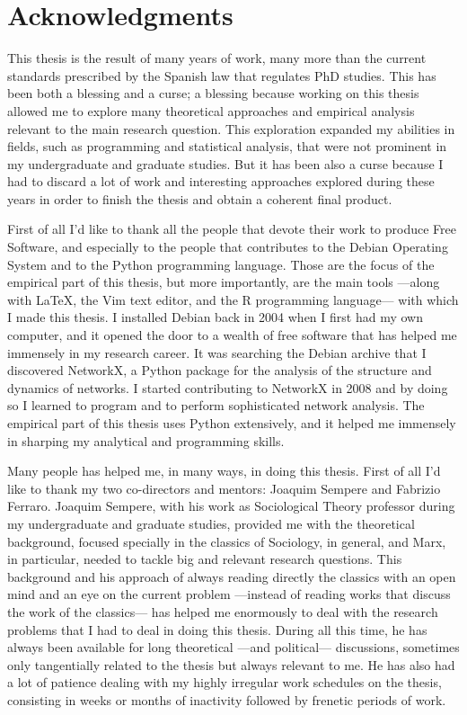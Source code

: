 \chapter*{Acknowledgments}

This thesis is the result of many years of work, many more than the current standards prescribed by the Spanish law that regulates PhD studies. This has been both a blessing and a curse; a blessing because working on this thesis allowed me to explore many theoretical approaches and empirical analysis relevant to the main research question. This exploration expanded my abilities in fields, such as programming and statistical analysis, that were not prominent in my undergraduate and graduate studies. But it has been also a curse because I had to discard a lot of work and interesting approaches explored during these years in order to finish the thesis and obtain a coherent final product.

First of all I'd like to thank all the people that devote their work to produce Free Software, and especially to the people that contributes to the Debian Operating System and to the Python programming language. Those are the focus of the empirical part of this thesis, but more importantly, are the main tools ---along with \LaTeX, the Vim text editor, and the R programming language--- with which I made this thesis. I installed Debian back in 2004 when I first had my own computer, and it opened the door to a wealth of free software that has helped me immensely in my research career. It was searching the Debian archive that I discovered NetworkX, a Python package for the analysis of the structure and dynamics of networks. I started contributing to NetworkX in 2008 and by doing so I learned to program and to perform sophisticated network analysis. The empirical part of this thesis uses Python extensively, and it helped me immensely in sharping my analytical and programming skills.

Many people has helped me, in many ways, in doing this thesis. First of all I'd like to thank my two co-directors and mentors: Joaquim Sempere and Fabrizio Ferraro. Joaquim Sempere, with his work as Sociological Theory professor during my undergraduate and graduate studies, provided me with the theoretical background, focused specially in the classics of Sociology, in general, and Marx, in particular, needed to tackle big and relevant research questions. This background and his approach of always reading directly the classics with an open mind and an eye on the current problem ---instead of reading works that discuss the work of the classics--- has helped me enormously to deal with the research problems that I had to deal in doing this thesis. During all this time, he has always been available for long theoretical ---and political--- discussions, sometimes only tangentially related to the thesis but always relevant to me. He has also had a lot of patience dealing with my highly irregular work schedules on the thesis, consisting in weeks or months of inactivity followed by frenetic periods of work.

